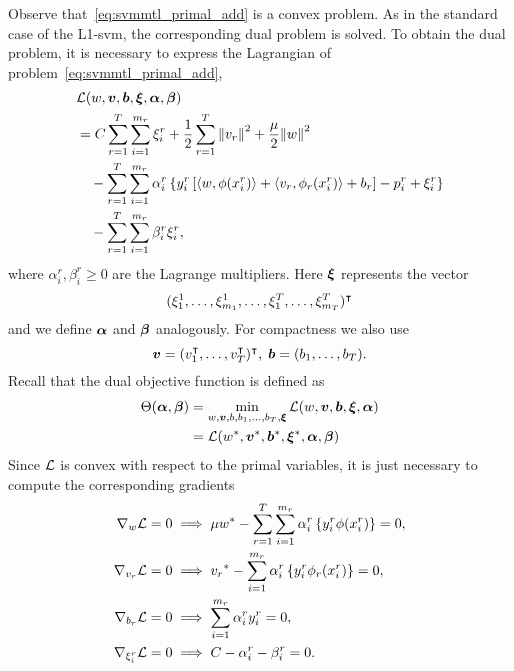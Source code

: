 Observe that~\eqref{eq:svmmtl_primal_add} is a convex problem. As in the standard case of the L1-\acrshort{svm}, the corresponding dual problem is solved. To obtain the dual problem, it is necessary to express the Lagrangian of problem~\eqref{eq:svmmtl_primal_add},
\begin{equation}\label{eq:svmmtl_lagrangian_add}
    \begin{aligned}
        & \lagr({w}, \fv{v}, \fv{b}, \fv{\xi}, \fv{\alpha}, \fv{\beta}) \\
        &= C \sum_{r= 1}^T \sum_{i=1}^{m_r} {\xi_{i}^r} + \frac{1}{2} \sum_{r= 1}^T{\norm{{v}_r}^2} + \frac{\mu}{2} {\norm{{w}}}^2 \\
        &\quad -  \sum_{r= 1}^T \sum_{i=1}^{m_r} \alpha_i^r \left\lbrace y_{i}^r \left[ \dotp{w}{\phi(x_{i}^r)} + \dotp{{v}_r}{\phi_r(x_{i}^r)} + b_r \right] - p_{i}^r + \xi_{i}^r  \right\rbrace \\
        &\quad -  \sum_{r= 1}^T \sum_{i=1}^{m_r} \beta_i^r \xi_i^r ,
    \end{aligned}
\end{equation}
where $\alpha_i^r, \beta_i^r \geq 0$ are the Lagrange multipliers. Here $\bm{\xi}$ represents the vector $$(\xi_1^1, \ldots, \xi_{m_1}^1, \ldots, \xi_1^T, \ldots, \xi_{m_T}^T)^\intercal$$ and we define $\bm{\alpha}$ and $\bm{\beta}$ analogously. For compactness we also use
$$ \bm{v} = (v_1^\intercal, \ldots, v_T^\intercal)^\intercal,\; \bm{b} = (b_1, \ldots, b_T).$$
Recall that the dual objective function is defined as 
\begin{equation}\nonumber
    \begin{aligned}
         \Theta(\bm{\alpha}, \bm{\beta}) &=  \min_{{w}, \bm{v}, b, b_1, \ldots, b_T, \bm{\xi}} \mathcal{L}({w}, \bm{v}, \bm{b}, \bm{\xi}, \bm{\alpha}) \\
         &= \mathcal{L}({{w}}^*, {\bm{v}}^*, {\bm{b}}^*, {\bm{\xi}}^*, \bm{\alpha}, \bm{\beta})
    \end{aligned}    
\end{equation}
Since $\mathcal{L}$ is convex with respect to the primal variables, it is just necessary to compute the corresponding gradients
\begin{align}
    \grad_{{w}} \lagr  = 0  &\implies \mu \optim{{w}} - \sum_{r= 1}^T \sum_{i=1}^{m_r} {\alpha_i^r} \left\lbrace y_i^r \phi(x_i^r) \right\rbrace = 0 , \label{eq:common_repr_add} \\
    \grad_{{v}_r} \lagr  = 0 &\implies \optim{{v}_r} - \sum_{i=1}^{m_r} {\alpha_i^r} \left\lbrace y_i^r \phi_r(x_i^r) \right\rbrace = 0 , \label{eq:specific_repr_add} \\
    \grad_{b_r} \lagr  = 0 &\implies \sum_{i=1}^{m_r} {\alpha_i^r} y_i^r = 0 , \label{eq:specific_eqconstr_add} \\
    \grad_{\xi_i^r} \lagr  = 0 &\implies C - {\alpha_i^r} - {\beta_i^r} = 0 .\label{eq:xi_feas_add}
\end{align}
